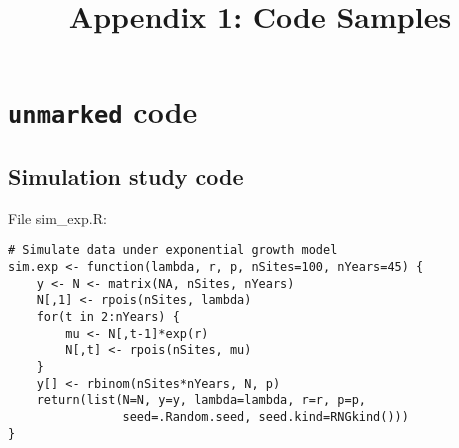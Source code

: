 \documentclass[12pt]{article}
\begin{document}
\title{Appendix 1: Code Samples}
\maketitle
\section{\texttt{unmarked} code}

\subsection{Simulation study code}

File sim\_exp.R:
\begin{verbatim}
# Simulate data under exponential growth model
sim.exp <- function(lambda, r, p, nSites=100, nYears=45) {
    y <- N <- matrix(NA, nSites, nYears)
    N[,1] <- rpois(nSites, lambda)
    for(t in 2:nYears) {
        mu <- N[,t-1]*exp(r)
        N[,t] <- rpois(nSites, mu)
    }
    y[] <- rbinom(nSites*nYears, N, p)
    return(list(N=N, y=y, lambda=lambda, r=r, p=p,
                seed=.Random.seed, seed.kind=RNGkind()))
}
\end{verbatim}
\end{document}

